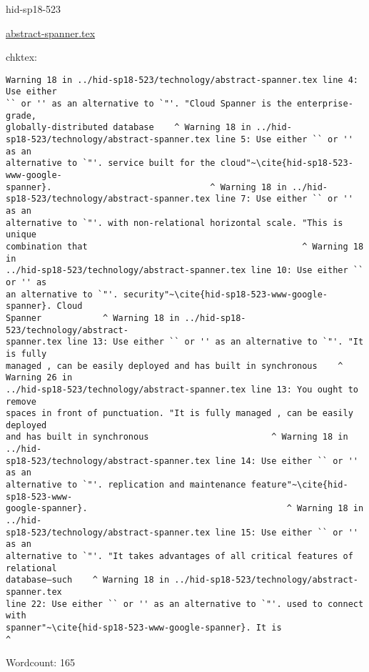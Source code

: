 \begin{IU}

hid-sp18-523

\href{https://github.com/cloudmesh-community/hid-sp18-523/blob/master//technology/abstract-spanner.tex}{abstract-spanner.tex}

 
chktex:
\begin{tiny}
\begin{verbatim}
Warning 18 in ../hid-sp18-523/technology/abstract-spanner.tex line 4: Use either
`` or '' as an alternative to `"'. "Cloud Spanner is the enterprise-grade,
globally-distributed database    ^ Warning 18 in ../hid-
sp18-523/technology/abstract-spanner.tex line 5: Use either `` or '' as an
alternative to `"'. service built for the cloud"~\cite{hid-sp18-523-www-google-
spanner}.                               ^ Warning 18 in ../hid-
sp18-523/technology/abstract-spanner.tex line 7: Use either `` or '' as an
alternative to `"'. with non-relational horizontal scale. "This is unique
combination that                                          ^ Warning 18 in
../hid-sp18-523/technology/abstract-spanner.tex line 10: Use either `` or '' as
an alternative to `"'. security"~\cite{hid-sp18-523-www-google-spanner}. Cloud
Spanner            ^ Warning 18 in ../hid-sp18-523/technology/abstract-
spanner.tex line 13: Use either `` or '' as an alternative to `"'. "It is fully
managed , can be easily deployed and has built in synchronous    ^ Warning 26 in
../hid-sp18-523/technology/abstract-spanner.tex line 13: You ought to remove
spaces in front of punctuation. "It is fully managed , can be easily deployed
and has built in synchronous                        ^ Warning 18 in ../hid-
sp18-523/technology/abstract-spanner.tex line 14: Use either `` or '' as an
alternative to `"'. replication and maintenance feature"~\cite{hid-sp18-523-www-
google-spanner}.                                       ^ Warning 18 in ../hid-
sp18-523/technology/abstract-spanner.tex line 15: Use either `` or '' as an
alternative to `"'. "It takes advantages of all critical features of relational
database—such    ^ Warning 18 in ../hid-sp18-523/technology/abstract-spanner.tex
line 22: Use either `` or '' as an alternative to `"'. used to connect with
spanner"~\cite{hid-sp18-523-www-google-spanner}. It is
^
\end{verbatim}
\end{tiny}

Wordcount: 165

\end{IU}

